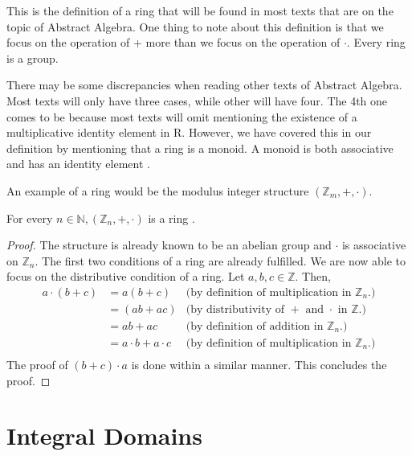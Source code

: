 \documentclass{article}
\begin{document}
This is the definition of a ring that will be found in most texts that are on the topic of Abstract Algebra. One thing to note about
this definition is that we focus on the operation of $+$ more than we focus on the operation of $\cdot$.
Every ring is a group.

\begin{remark}
    There may be some discrepancies when reading other texts of Abstract Algebra. Most texts will only have three cases, while other will have four. The 4th one comes to be because most texts will omit mentioning the existence of a multiplicative identity element in R. However, we have covered this in our definition by mentioning that a ring is a monoid. A monoid is both associative and has an identity element \cite{FirstCourse}. \\
\end{remark}

An example of a ring would be the modulus integer structure $(\mathbb{Z}_m, +,\cdot)$.

\begin{theorem}\label{thm:ring_example}
    For every $n \in \mathbb{N}, (\mathbb{Z}_n, +,\cdot)$ is a ring \cite{AdvancedMath}.
\end{theorem}

\begin{proof}
    The structure is already known to be an abelian group and $\cdot$ is associative on $\mathbb{Z}_n$. The first two conditions of a ring are already fulfilled. We are now able to focus on the distributive condition of a ring. Let $a,b,c \in \mathbb{Z}$. Then,
    \begin{align*}
        a \cdot (b + c) &= a(b + c) &\text{(by definition of multiplication in $\mathbb{Z}_n$.)}\\
        &= (ab + ac) &\text{(by distributivity of $+$ and $\cdot$ in $\mathbb{Z}$.)}\\
        &= ab + ac &\text{(by definition of addition in $\mathbb{Z}_n$.)}\\
        &= a \cdot b + a \cdot c &\text{(by definition of multiplication in $\mathbb{Z}_n$.)}\\
    \end{align*}
    The proof of $(b + c) \cdot a$ is done within a similar manner.
    This concludes the proof.
\end{proof}

\section{Integral Domains}
\end{document}
